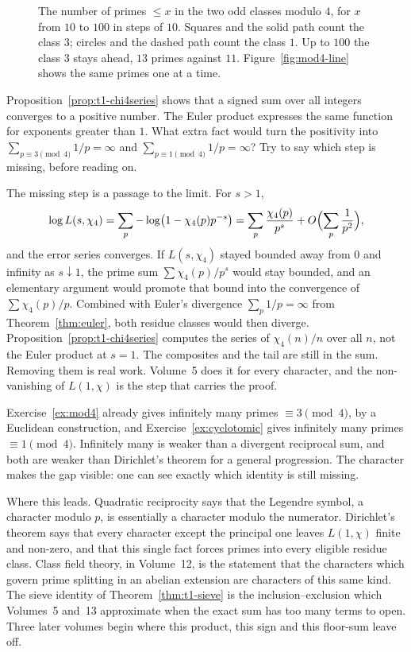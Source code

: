 \begin{figure}[ht]
\centering
{}
\caption{The number of primes $\le x$ in the two odd classes modulo $4$, for $x$ from $10$ to $100$ in steps of $10$. Squares and the solid path count the class $3$; circles and the dashed path count the class $1$. Up to $100$ the class $3$ stays ahead, $13$ primes against $11$. Figure~\ref{fig:mod4-line} shows the same primes one at a time.}
\label{fig:t1-race}
\end{figure}

\begin{think}
Proposition~\ref{prop:t1-chi4series} shows that a signed sum over all integers converges to a positive number. The Euler product expresses the same function for exponents greater than $1$. What extra fact would turn the positivity into $\sum_{p\equiv3\pmod4}1/p=\infty$ and $\sum_{p\equiv1\pmod4}1/p=\infty$? Try to say which step is missing, before reading on.
\end{think}

The missing step is a passage to the limit. For $s>1$,
\[
\log L(s,\chi_4)=\sum_p-\log\bigl(1-\chi_4(p)p^{-s}\bigr)
=\sum_p\frac{\chi_4(p)}{p^s}+O\Bigl(\sum_p\frac1{p^2}\Bigr),
\]
and the error series converges. If $L(s,\chi_4)$ stayed bounded away from $0$ and infinity as $s\downarrow1$, the prime sum $\sum\chi_4(p)/p^s$ would stay bounded, and an elementary argument would promote that bound into the convergence of $\sum\chi_4(p)/p$. Combined with Euler's divergence $\sum_p1/p=\infty$ from Theorem~\ref{thm:euler}, both residue classes would then diverge. Proposition~\ref{prop:t1-chi4series} computes the series of $\chi_4(n)/n$ over all $n$, not the Euler product at $s=1$. The composites and the tail are still in the sum. Removing them is real work. Volume~5 does it for every character, and the non-vanishing of $L(1,\chi)$ is the step that carries the proof.

Exercise~\ref{ex:mod4} already gives infinitely many primes $\equiv3\pmod4$, by a Euclidean construction, and Exercise~\ref{ex:cyclotomic} gives infinitely many primes $\equiv1\pmod4$. Infinitely many is weaker than a divergent reciprocal sum, and both are weaker than Dirichlet's theorem for a general progression. The character makes the gap visible: one can see exactly which identity is still missing.

\begin{beauty}
Where this leads. Quadratic reciprocity says that the Legendre symbol, a character modulo $p$, is essentially a character modulo the numerator. Dirichlet's theorem says that every character except the principal one leaves $L(1,\chi)$ finite and non-zero, and that this single fact forces primes into every eligible residue class. Class field theory, in Volume~12, is the statement that the characters which govern prime splitting in an abelian extension are characters of this same kind. The sieve identity of Theorem~\ref{thm:t1-sieve} is the inclusion--exclusion which Volumes~5 and~13 approximate when the exact sum has too many terms to open. Three later volumes begin where this product, this sign and this floor-sum leave off.
\end{beauty}

